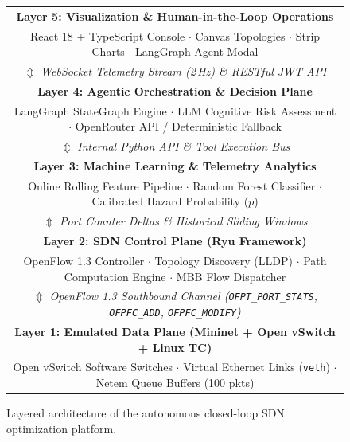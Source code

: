 \begin{figure}[H]
  \centering
  \begin{tcolorbox}[colback=white,colframe=sdnnavy,arc=3pt,title=\textbf{End-to-End System Layered Architecture}]
  \centering
  \small\sffamily
  \begin{tabular}{|c|}
    \hline
    \textbf{Layer 5: Visualization \& Human-in-the-Loop Operations}\\
    React 18 + TypeScript Console $\cdot$ Canvas Topologies $\cdot$ Strip Charts $\cdot$ LangGraph Agent Modal\\
    \hline
    $\Updownarrow$ \textit{WebSocket Telemetry Stream (2\,Hz) \& RESTful JWT API}\\
    \hline
    \textbf{Layer 4: Agentic Orchestration \& Decision Plane}\\
    LangGraph StateGraph Engine $\cdot$ LLM Cognitive Risk Assessment $\cdot$ OpenRouter API / Deterministic Fallback\\
    \hline
    $\Updownarrow$ \textit{Internal Python API \& Tool Execution Bus}\\
    \hline
    \textbf{Layer 3: Machine Learning \& Telemetry Analytics}\\
    Online Rolling Feature Pipeline $\cdot$ Random Forest Classifier $\cdot$ Calibrated Hazard Probability ($p$)\\
    \hline
    $\Updownarrow$ \textit{Port Counter Deltas \& Historical Sliding Windows}\\
    \hline
    \textbf{Layer 2: SDN Control Plane (Ryu Framework)}\\
    OpenFlow 1.3 Controller $\cdot$ Topology Discovery (LLDP) $\cdot$ Path Computation Engine $\cdot$ MBB Flow Dispatcher\\
    \hline
    $\Updownarrow$ \textit{OpenFlow 1.3 Southbound Channel (\texttt{OFPT\_PORT\_STATS}, \texttt{OFPFC\_ADD}, \texttt{OFPFC\_MODIFY})}\\
    \hline
    \textbf{Layer 1: Emulated Data Plane (Mininet + Open vSwitch + Linux TC)}\\
    Open vSwitch Software Switches $\cdot$ Virtual Ethernet Links (\texttt{veth}) $\cdot$ Netem Queue Buffers (100 pkts)\\
    \hline
  \end{tabular}
  \end{tcolorbox}
  \caption{Layered architecture of the autonomous closed-loop SDN optimization platform.}
  \label{fig:arch_block_diagram}
\end{figure}

